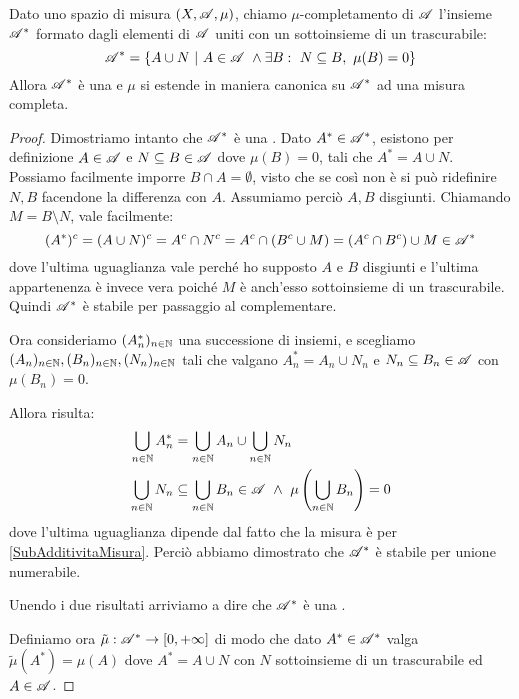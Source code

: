 \begin{proposition}\label{CompletamentoMisura}
	Dato uno spazio di misura $(X,\mathscr A,\mu)$, chiamo $\mu$-completamento di $\mathscr A$ l'insieme $\mathscr A^*$ formato dagli elementi di $\mathscr A$ uniti con un sottoinsieme di un trascurabile:
	\begin{equation*}
		\A^*=\{A\cup N\ |\ A\in\A\ \wedge \exists B:\ N\subseteq B,\ \mu(B)=0\}
	\end{equation*}
	Allora $\mathscr A^*$ è una \sigalg{} e $\mu$ si estende in maniera canonica su $\mathscr A^*$ ad una misura completa.
\end{proposition}
\begin{proof}
	Dimostriamo intanto che $\mathscr A^*$ è una \sigalg{}.
	Dato $A^*\in\mathscr A^*$, esistono per definizione $A\in\mathscr A$ e $N\subseteq B\in\mathscr A$ dove $\mu(B)=0$, tali che $A^*=A\cup N$. Possiamo facilmente imporre $B\cap A=\emptyset$, visto che se così non è si può ridefinire $N,B$ facendone la differenza con $A$. Assumiamo perciò $A,B$ disgiunti.
	Chiamando $M=B\setminus N$, vale facilmente:
	\begin{equation*}
		(A^*)^c=(A\cup N)^c=A^c\cap N^c=A^c\cap(B^c\cup M)=(A^c\cap B^c )\cup M \in\mathscr A^*
	\end{equation*}
	dove l'ultima uguaglianza vale perché ho supposto $A$ e $B$ disgiunti e l'ultima appartenenza è invece vera poiché $M$ è anch'esso sottoinsieme di un trascurabile. Quindi $\mathscr A^*$ è stabile per passaggio al complementare.
	
	Ora consideriamo $(A^*_n)_{n\in\mathbb N}$ una successione di insiemi, e scegliamo $(A_n)_{n\in\mathbb N},(B_n)_{n\in\mathbb N},(N_n)_{n\in\mathbb N}$ tali che valgano $A^*_n=A_n\cup N_n$ e $N_n\subseteq B_n\in\mathscr A$ con $\mu(B_n)=0$.
	
	Allora risulta:
	\begin{align*}
		\bigcup_{n\in\N}A^*_n &=\bigcup_{n\in\N}A_n \cup \bigcup_{n\in\N}N_n\\
		\bigcup_{n\in\N}N_n &\subseteq \bigcup_{n\in\N}B_n\in\A\ \wedge\ \mu\left(\bigcup_{n\in\N}B_n\right)=0
	\end{align*}
	dove l'ultima uguaglianza dipende dal fatto che la misura è \sigsubadd{} per \cref{SubAdditivitaMisura}. Perciò abbiamo dimostrato che $\mathscr A^*$ è stabile per unione numerabile.
	
	Unendo i due risultati arriviamo a dire che $\mathscr A^*$ è una \sigalg{}.
	
	Definiamo ora $\tilde\mu:\mathscr A^*\to[0,+\infty]$ di modo che dato $A^*\in\mathscr A^*$ valga $\tilde\mu(A^*)=\mu(A)$ dove $A^*=A\cup N$ con $N$ sottoinsieme di un trascurabile ed $A\in\mathscr A$.
	

\end{proof}
